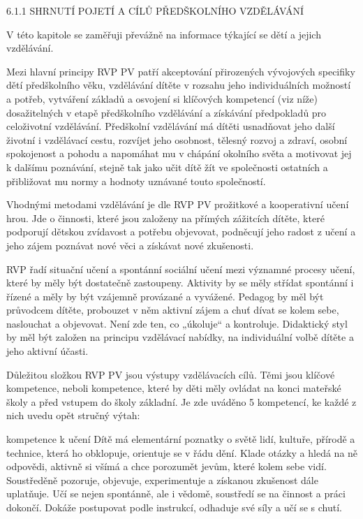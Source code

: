 	6.1.1 SHRNUTÍ  POJETÍ A CÍLŮ PŘEDŠKOLNÍHO VZDĚLÁVÁNÍ

	V této kapitole se zaměřuji převážně na informace týkající se dětí a jejich vzdělávání.

	Mezi hlavní principy RVP PV patří akceptování přirozených vývojových specifiky dětí předškolního věku, vzdělávání dítěte v rozsahu jeho individuálních možností a potřeb, vytváření základů a osvojení si klíčových kompetencí (viz níže) dosažitelných v etapě předškolního vzdělávání a získávání předpokladů pro celoživotní vzdělávání.
	Předškolní vzdělávání má dítěti usnadňovat jeho další životní i vzdělávací cestu, rozvíjet jeho osobnost, tělesný rozvoj a zdraví, osobní spokojenost a pohodu a napomáhat mu v chápání okolního světa a motivovat jej k dalšímu poznávání, stejně tak jako učit dítě žít ve společnosti ostatních a přibližovat mu normy a hodnoty uznávané touto společností.

	Vhodnými metodami vzdělávání je dle RVP PV prožitkové a kooperativní učení hrou. Jde o činnosti, které jsou založeny na přímých zážitcích dítěte, které podporují dětskou zvídavost a potřebu objevovat, podněcují jeho radost z učení a jeho zájem poznávat nové věci a získávat nové zkušenosti.

	RVP řadí situační učení a spontánní sociální učení mezi významné procesy učení, které by měly být dostatečně zastoupeny. Aktivity by se měly střídat spontánní i řízené a měly by být vzájemně provázané a vyvážené. Pedagog by měl být průvodcem dítěte, probouzet v něm aktivní zájem a chuť dívat se kolem sebe, naslouchat a objevovat. Není zde ten, co „úkoluje“ a kontroluje. Didaktický styl by měl být založen na principu vzdělávací nabídky, na individuální volbě dítěte a jeho aktivní účasti.

	Důležitou složkou RVP PV jsou výstupy vzdělávacích cílů. Těmi jsou klíčové kompetence, neboli kompetence, které by děti měly ovládat na konci mateřské školy a před vstupem do školy základní. Je zde uváděno 5 kompetencí, ke každé z nich uvedu opět stručný výtah:

	kompetence k učení
	Dítě má elementární poznatky o světě lidí, kultuře, přírodě a technice, která ho obklopuje, orientuje se v řádu dění. Klade otázky a hledá na ně odpovědi, aktivně si všímá a chce porozumět jevům, které kolem sebe vidí. Soustředěně pozoruje, objevuje, experimentuje a získanou zkušenost dále uplatňuje. Učí se nejen spontánně, ale i vědomě, soustředí se na činnost a práci dokončí. Dokáže postupovat podle instrukcí, odhaduje své síly a učí se s chutí.

